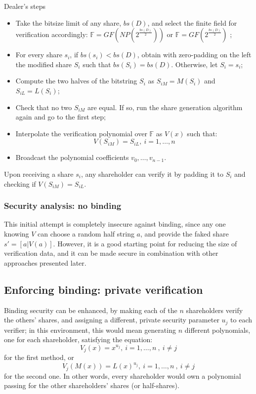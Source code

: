 \documentclass[10pt,journal,cspaper,compsoc]{IEEEtran}
\begin{document}
Dealer's steps

\begin{itemize}
\item Take the bitsize limit of any share, $bs(D)$,
and select the finite field for verification accordingly:
$\mathbb{F}=GF(NP(2^{\frac{bs(D)}{2}}))$
or $\mathbb{F}=GF(2^{\frac{bs(D)}{2}})$
;
\item For every share $s_i$, if $bs(s_i)<bs(D)$, obtain with zero-padding on the left the modified share $S_i$ such that $bs(S_i)=bs(D)$. Otherwise, let $S_i = s_i$;
\item Compute the two halves of the bitstring $S_i$ as ${S_{iM}=M(S_i)}$ and ${S_{iL}=L(S_i)}$;
\item Check that no two $S_{iM}$ are equal. If so, run the share generation algorithm again and go to the first step;
\item Interpolate the verification polynomial over $\mathbb{F}$ as $V(x)$ such that:
\begin{equation}
V(S_{iM})=S_{iL},~i=1,\ldots,n
\end{equation}
\item Broadcast the polynomial coefficients $v_0,\ldots,v_{n-1}$.
\end{itemize}

Upon receiving a share $s_i$, any shareholder can verify it by padding it to $S_i$ and checking if $V(S_{iM})=S_{iL}$.\\


\subsubsection{Security analysis: no binding}
This initial attempt is completely insecure against binding, since any one knowing $V$ can choose a random half string $a$, and provide the faked share $s' = [a|V(a)]$. However, it is a good starting point for reducing the size of verification data, and it can be made secure in combination with other approaches presented later.

\subsection{Enforcing binding: private verification}

Binding security can be enhanced, by making each of the $n$ shareholders verify the others' shares, and assigning a different, private security parameter $u_j$ to each verifier; in this environment, this would mean generating $n$ different polynomials, one for each shareholder, satisfying the equation:
\begin{equation}
V_j(x) = x^{u_j},~i=1,\ldots,n~,~i \neq j
\end{equation}
for the first method, or
\begin{equation}
V_j(M(x))=L(x)^{u_j},~i=1,\ldots,n~,~i \neq j
\end{equation}
for the second one. In other words, every shareholder would own a polynomial passing for the other shareholders' shares (or half-shares).
\end{document}

